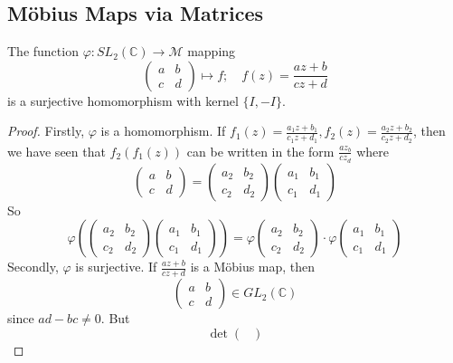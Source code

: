 \subsection{M\"obius Maps via Matrices}
\begin{proposition}
	The function \(\varphi\colon SL_2(\mathbb C) \to \mathcal M\) mapping
	\[
		\begin{pmatrix}
			a & b \\ c & d
		\end{pmatrix} \mapsto f;\quad f(z) = \frac{az + b}{cz + d}
	\]
	is a surjective homomorphism with kernel \(\{ I, -I \}\).
\end{proposition}
\begin{proof}
	Firstly, \(\varphi\) is a homomorphism.
	If \(f_1(z) = \frac{a_1z+b_1}{c_1z+d_1}, f_2(z) = \frac{a_2z+b_2}{c_2z+d_2}\), then we have seen that \(f_2(f_1(z))\) can be written in the form \(\frac{az_b}{cz_d}\) where
	\[
		\begin{pmatrix}
			a & b \\ c & d
		\end{pmatrix} = \begin{pmatrix}
			a_2 & b_2 \\ c_2 & d_2
		\end{pmatrix}\begin{pmatrix}
			a_1 & b_1 \\ c_1 & d_1
		\end{pmatrix}
	\]
	So
	\[
		\varphi\left( \begin{pmatrix}
				a_2 & b_2 \\ c_2 & d_2
			\end{pmatrix}\begin{pmatrix}
				a_1 & b_1 \\ c_1 & d_1
			\end{pmatrix} \right) = \varphi \begin{pmatrix}
			a_2 & b_2 \\ c_2 & d_2
		\end{pmatrix} \cdot \varphi \begin{pmatrix}
			a_1 & b_1 \\ c_1 & d_1
		\end{pmatrix}
	\]
	Secondly, \(\varphi\) is surjective.
	If \(\frac{az+b}{cz+d}\) is a M\"obius map, then
	\[
		\begin{pmatrix}
			a & b \\ c & d
		\end{pmatrix} \in GL_2(\mathbb C)
	\]
	since \(ad-bc\neq 0\).
	But
	\[
		\det \begin{pmatrix}

\end{pmatrix}\]
\end{proof}
